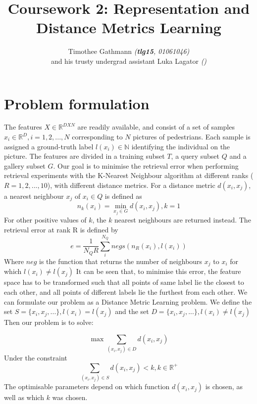 \documentclass[10pt,technote]{IEEEtran}
\title{Coursework 2: Representation and Distance Metrics Learning }
\author{Timothee Gathmann \textit{(\textbf{tlg15}, 01061046)}\\ and his trusty undergrad assistant Luka Lagator\textit{ ()}}
\begin{document}
\maketitle

\section{Problem formulation}
The features $X \in \mathbb{R}^{D X N}$ are readily available, and consist of a set of samples $x_i \in \mathbb{R}^D, i = 1, 2, ..., N$ corresponding to $N$ pictures of pedestrians. Each sample is assigned a ground-truth label $l(x_i) \in \mathbb{N}$ identifying the individual on the picture. The features are divided in a training subset $T$, a query subset $Q$ and a gallery subset $G$. Our goal is to minimise the retrieval error when performing retrieval experiments with the K-Nearest Neighbour algorithm \cite{Cover1967} at different ranks ($R = 1, 2, ..., 10 $), with different distance metrics. For a distance metric $d(x_i, x_j)$, a nearest neighbour $x_j$ of $x_i \in Q$ is defined as
\begin{equation}
n_k(x_i) = \min_{x_j \in G}  d(x_i, x_j), k = 1
\end{equation}
For other positive values of $k$, the $k$ nearest neighbours are returned instead.
The retrieval error at rank R is defined by
\begin{equation}
e = \frac{1}{N_Q R}\sum^{N_Q}_{i} negs(n_R(x_i), l(x_i)) 
\end{equation}
Where $neg$ is the function that returns the number of neighbours $x_j$ to $x_i$ for which $l(x_i) \neq l(x_j)$
It can be seen that, to minimise this error, the feature space has to be transformed such that all points of same label lie the closest to each other, and all points of different labels lie the furthest from each other.
We can formulate our problem as a Distance Metric Learning problem. We define the set $S = \lbrace x_i, x_j, ...\rbrace, l(x_i) = l(x_j)$ and the set $D = \lbrace x_i, x_j, ...\rbrace, l(x_i) \neq l(x_j)$
Then our problem is to solve:

\begin{equation}
\max \sum_{(x_i, x_j) \in D} d(x_i, x_j)
\end{equation}
Under the constraint
\begin{equation}
\sum_{(x_i, x_j) \in S} d(x_i, x_j) < k, k \in \mathbb{R^+}
\end{equation}
The optimisable parameters depend on which function $d(x_i, x_j)$ is chosen, as well as which $k$ was chosen.







\end{document}
